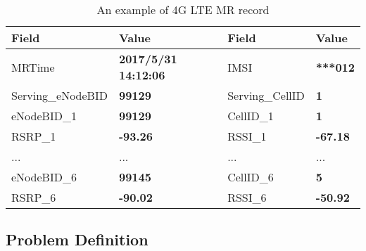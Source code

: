 \begin{table}\scriptsize
\caption{An example of 4G LTE MR record}\label{tab:mr}
  \centering
  \begin{tabular}{|l|l||l|l|}
  \hline
  \textbf{Field}    & \textbf{Value}                 & \textbf{Field}    & \textbf{Value}   \\ \hline \hline
  MRTime            & \textbf{2017/5/31 14:12:06}    & IMSI              & \textbf{***012}  \\ \hline
  Serving\_eNodeBID & \textbf{99129}                 & Serving\_CellID   & \textbf{1}       \\ \hline
  eNodeBID\_1       & \textbf{99129}                 & CellID\_1         & \textbf{1}       \\ \hline
  RSRP\_1           & \textbf{-93.26}                & RSSI\_1           & \textbf{-67.18}  \\ \hline
  ...               & ...                            & ...               & ...              \\ \hline
  eNodeBID\_6       & \textbf{99145}                 & CellID\_6         & \textbf{5}       \\ \hline
  RSRP\_6           & \textbf{-90.02}                & RSSI\_6           & \textbf{-50.92}  \\ \hline
  \end{tabular}
\end{table}

%



\subsection{Problem Definition}

